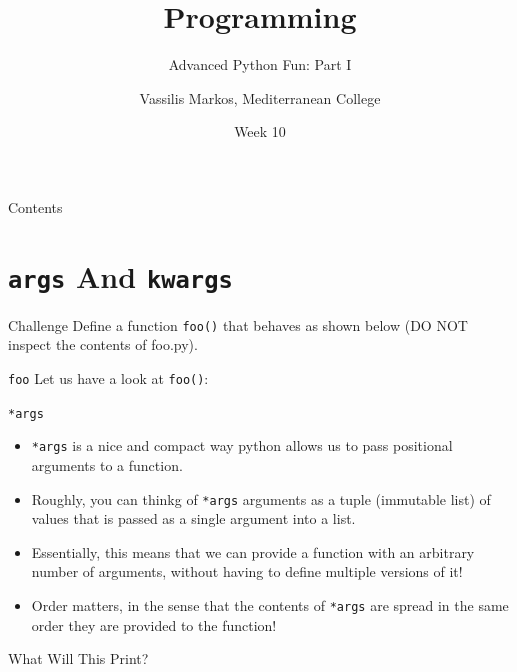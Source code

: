 \documentclass[aspectratio=169, 12pt, xcolor=table]{beamer}
\title{Programming}
\subtitle{Advanced Python Fun: Part I}
\date{Week 10}
\author{Vassilis Markos, Mediterranean College}
\begin{document}
	\begin{frame}
		\titlepage
	\end{frame}

	\begin{frame}{Contents}
		\tableofcontents
	\end{frame}

	\section{\texttt{args} And \texttt{kwargs}}\label{sec:args-and-kwargs}
	
	\sectionframe
	
	\begin{frame}{Challenge}
		Define a function \texttt{foo()} that behaves as shown below (DO NOT inspect the contents of foo.py).
		
	\end{frame}

	\begin{frame}{\texttt{foo}}
		Let us have a look at \texttt{foo()}:
		
	\end{frame}

	\begin{frame}{\texttt{*args}}
		\begin{itemize}
			\item \texttt{*args} is a nice and compact way python allows us to pass positional arguments to a function.
			\item Roughly, you can thinkg of \texttt{*args} arguments as a tuple (immutable list) of values that is passed as a single argument into a list.
			\item Essentially, this means that we can provide a function with an arbitrary number of arguments, without having to define multiple versions of it!
			\item Order matters, in the sense that the contents of \texttt{*args} are spread in the same order they are provided to the function!
		\end{itemize}
	\end{frame}

	\begin{frame}{What Will This Print?}
		
	\end{frame}
	
\end{document}
